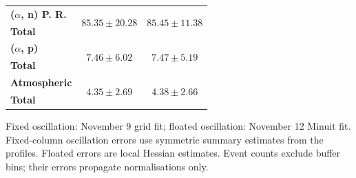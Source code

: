 \begin{table}
\begin{tabular}{lcc}
        \textbf{($\alpha$, n) P. R.} & \multirow{2}{*}{$85.35\pm20.28$} & \multirow{2}{*}{$85.45\pm11.38$} \\
        \textbf{Total} & & \\
        \hline

        \textbf{($\alpha$, p)} & \multirow{2}{*}{$7.46\pm6.02$} & \multirow{2}{*}{$7.47\pm5.19$} \\
        \textbf{Total} & & \\
        \hline

        \textbf{Atmospheric} & \multirow{2}{*}{$4.35\pm2.69$} & \multirow{2}{*}{$4.38\pm2.66$} \\
        \textbf{Total} & & \\
        \hline

        \hline\hline
    \end{tabular}
\par\smallskip\footnotesize Fixed oscillation: November 9 grid fit; floated oscillation: November 12 Minuit fit. Fixed-column oscillation errors use symmetric summary estimates from the profiles. Floated errors are local Hessian estimates. Event counts exclude buffer bins; their errors propagate normalisations only.
\end{table}
